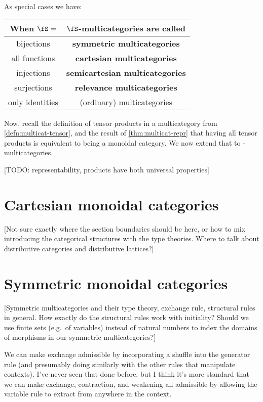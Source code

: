 \documentclass{book}
\begin{document}
As special cases we have:
\begin{center}
\begin{tabular}{c|c}
  When $\fS=$ & $\fS$-multicategories are called\\\hline
  bijections & \textbf{symmetric multicategories}\\
  all functions & \textbf{cartesian multicategories}\\
  injections & \textbf{semicartesian multicategories}\\
  surjections & \textbf{relevance multicategories}\\
  only identities & (ordinary) multicategories
\end{tabular}
\end{center}

Now, recall the definition of tensor products in a multicategory from \cref{defn:multicat-tensor}, and the result of \cref{thm:multicat-repr} that having all tensor products is equivalent to being a monoidal category.
We now extend that to \fS-multicategories.

[TODO: representability, products have both universal properties]


\section{Cartesian monoidal categories}
\label{sec:cartmoncat}

[Not sure exactly where the section boundaries should be here, or how to mix introducing the categorical structures with the type theories.
Where to talk about distributive categories and distributive lattices?]


\section{Symmetric monoidal categories}
\label{sec:symmoncat}

[Symmetric multicategories and their type theory, exchange rule, structural rules in general.  How exactly do the structural rules work with initiality?  Should we use finite sets (e.g.\ of variables) instead of natural numbers to index the domains of morphisms in our symmetric multicategories?]

We can make exchange admissible by incorporating a shuffle into the generator rule (and presumably doing similarly with the other rules that manipulate contexts).
I've never seen that done before, but I think it's more standard that we can make exchange, contraction, and weakening all admissible by allowing the variable rule to extract from anywhere in the context.
\end{document}
